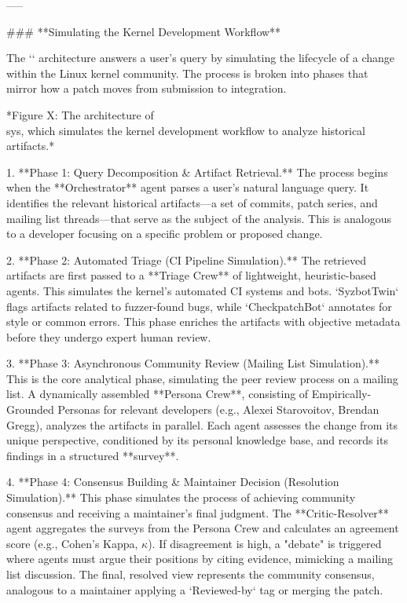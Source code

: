 -----

### **Simulating the Kernel Development Workflow**

The `\sys` architecture answers a user's query by simulating the lifecycle of a change within the Linux kernel community. The process is broken into phases that mirror how a patch moves from submission to integration.

*Figure X: The architecture of \\sys, which simulates the kernel development workflow to analyze historical artifacts.*

1.  **Phase 1: Query Decomposition & Artifact Retrieval.** The process begins when the **Orchestrator** agent parses a user's natural language query. It identifies the relevant historical artifacts—a set of commits, patch series, and mailing list threads—that serve as the subject of the analysis. This is analogous to a developer focusing on a specific problem or proposed change.

2.  **Phase 2: Automated Triage (CI Pipeline Simulation).** The retrieved artifacts are first passed to a **Triage Crew** of lightweight, heuristic-based agents. This simulates the kernel's automated CI systems and bots. `SyzbotTwin` flags artifacts related to fuzzer-found bugs, while `CheckpatchBot` annotates for style or common errors. This phase enriches the artifacts with objective metadata before they undergo expert human review.

3.  **Phase 3: Asynchronous Community Review (Mailing List Simulation).** This is the core analytical phase, simulating the peer review process on a mailing list. A dynamically assembled **Persona Crew**, consisting of Empirically-Grounded Personas for relevant developers (e.g., Alexei Starovoitov, Brendan Gregg), analyzes the artifacts in parallel. Each agent assesses the change from its unique perspective, conditioned by its personal knowledge base, and records its findings in a structured **survey**.

4.  **Phase 4: Consensus Building & Maintainer Decision (Resolution Simulation).** This phase simulates the process of achieving community consensus and receiving a maintainer's final judgment. The **Critic-Resolver** agent aggregates the surveys from the Persona Crew and calculates an agreement score (e.g., Cohen's Kappa, $κ$). If disagreement is high, a "debate" is triggered where agents must argue their positions by citing evidence, mimicking a mailing list discussion. The final, resolved view represents the community consensus, analogous to a maintainer applying a `Reviewed-by` tag or merging the patch.

